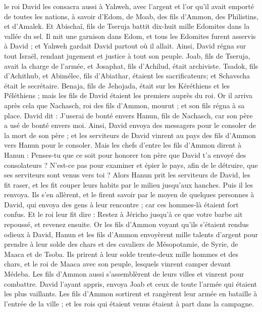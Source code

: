 \begin{multicols}{2}
le roi David les consacra aussi à Yahweh, avec l'argent et l'or qu'il avait emporté de toutes les nations, à savoir d'Edom, de Moab, des fils d'Ammon, des Philistins, et d’Amalek.
Et Abischaï, fils de Tseruja battit dix-huit mille Edomites dans la vallée du sel.
Il mit une garnison dans Edom, et tous les Edomites furent asservis à David ; et Yahweh gardait David partout où il allait.
Ainsi, David régna sur tout Israël, rendant jugement et justice à tout son peuple.
Joab, fils de Tseruja, avait la charge de l'armée, et Josaphat, fils d'Achilud, était archiviste.
Tsadok, fils d'Achithub, et Abimélec, fils d'Abiathar, étaient les sacrificateurs; et Schavscha était le secrétaire.
Benaja, fils de Jehojada, était sur les Kéréthiens et les Péléthiens ; mais les fils de David étaient les premiers auprès du roi.
\VerseOne{}Or il arriva après cela que Nachasch, roi des fils d’Ammon, mourut ; et son fils régna à sa place.
David dit : J'userai de bonté envers Hanun, fils de Nachasch, car son père a usé de bonté envers moi. Ainsi, David envoya des messagers pour le consoler de la mort de son père ; et les serviteurs de David vinrent au pays des fils d’Ammon vers Hanun pour le consoler.
Mais les chefs d'entre les fils d’Ammon dirent à Hanun : Penses-tu que ce soit pour honorer ton père que David t'a envoyé des consolateurs ? N'est-ce pas pour examiner et épier le pays, afin de le détruire, que ses serviteurs sont venus vers toi ?
Alors Hanun prit les serviteurs de David, les fit raser, et les fit couper leurs habits par le milieu jusqu'aux hanches. Puis il les renvoya.
Ils s'en allèrent, et le firent savoir par le moyen de quelques personnes à David, qui envoya des gens à leur rencontre ; car ces hommes-là étaient fort confus. Et le roi leur fit dire : Restez à Jéricho jusqu'à ce que votre barbe ait repoussé, et revenez ensuite.
Or les fils d’Ammon voyant qu'ils s'étaient rendus odieux à David, Hanun et les fils d'Ammon envoyèrent mille talents d'argent pour prendre à leur solde des chars et des cavaliers de Mésopotamie, de Syrie, de Maaca et de Tsoba.
Ils prirent à leur solde trente-deux mille hommes et des chars, et le roi de Maaca avec son peuple, lesquels vinrent camper devant Médeba. Les fils d'Ammon aussi s'assemblèrent de leurs villes et vinrent pour combattre.
David l’ayant appris, envoya Joab et ceux de toute l'armée qui étaient les plus vaillants.
Les fils d’Ammon sortirent et rangèrent leur armée en bataille à l'entrée de la ville ; et les rois qui étaient venus étaient à part dans la campagne.

\end{multicols}

